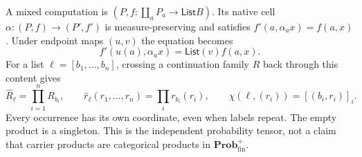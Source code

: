 \documentclass[11pt]{article}
\numberwithin{equation}{section}
\theoremstyle{definition}\newtheorem{definition}[theorem]{Definition}
\newcommand{\Prob}{\mathbf{Prob}^{+}_{\mathrm{fin}}}
\newcommand{\List}{\mathsf{List}}
\begin{document}
A mixed computation is $(P,f:\coprod_aP_a\to\List B)$. Its native cell
$\alpha:(P,f)\to(P',f')$ is measure-preserving and satisfies
$f'(a,\alpha_ax)=f(a,x)$. Under endpoint maps $(u,v)$ the equation becomes
\begin{equation}\label{eq:prob-square-main}
                    f'(u(a),\alpha_ax)=\List(v)f(a,x).
\end{equation}
For a list $\ell=[b_1,\ldots,b_n]$, crossing a continuation family $R$
back through this content gives
\begin{equation}\label{eq:prob-cross-main}
 \widehat R_\ell=\prod_{i=1}^nR_{b_i},\qquad
 \widehat r_\ell(r_1,\ldots,r_n)=\prod_i r_{b_i}(r_i),\qquad
 \chi(\ell,(r_i))=[(b_i,r_i)]_i.
\end{equation}
Every occurrence has its own coordinate, even when labels repeat. The
empty product is a singleton. This is the independent probability tensor,
not a claim that carrier products are categorical products in $\Prob$.
\end{document}
